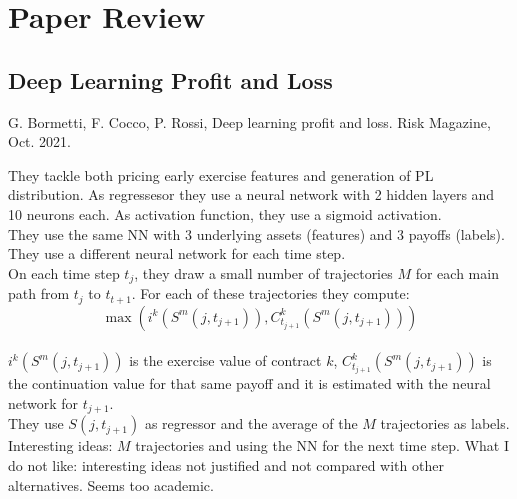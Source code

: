 \chapter{Paper Review}
\label{chap:Papers}

\section{Deep Learning Profit and Loss}

G. Bormetti, F. Cocco, P. Rossi, Deep learning profit and loss. Risk Magazine, Oct. 2021. \newline


They tackle both pricing early exercise features and generation of PL distribution. As regressesor they use a neural network with 2 hidden layers and 10 neurons each. As activation function, they use a sigmoid activation. \\


They use the same NN with 3 underlying assets (features) and 3 payoffs (labels). They use a different neural network for each time step. \\


On each time step $t_j$, they draw a small number of trajectories $M$ for each main path from $t_j$ to $t_{t+1}$. For each of these trajectories they compute:\\

$$\max\left(i^k\left(S^m(j,t_{j+1})\right),C^k_{t_{j+1}}\left(S^m(j,t_{j+1})\right)\right)$$ \\

$i^k\left(S^m(j,t_{j+1})\right)$ is the exercise value of contract $k$, $C^k_{t_{j+1}}\left(S^m(j,t_{j+1})\right)$ is the continuation value for that same payoff and it is estimated with the neural network for $t_{j+1}$. \\

They use $S(j,t_{j+1})$ as regressor and the average of the $M$ trajectories as labels. \\

Interesting ideas: $M$ trajectories and using the NN for the next time step.
What I do not like: interesting ideas not justified and not compared with other alternatives. Seems too academic.








